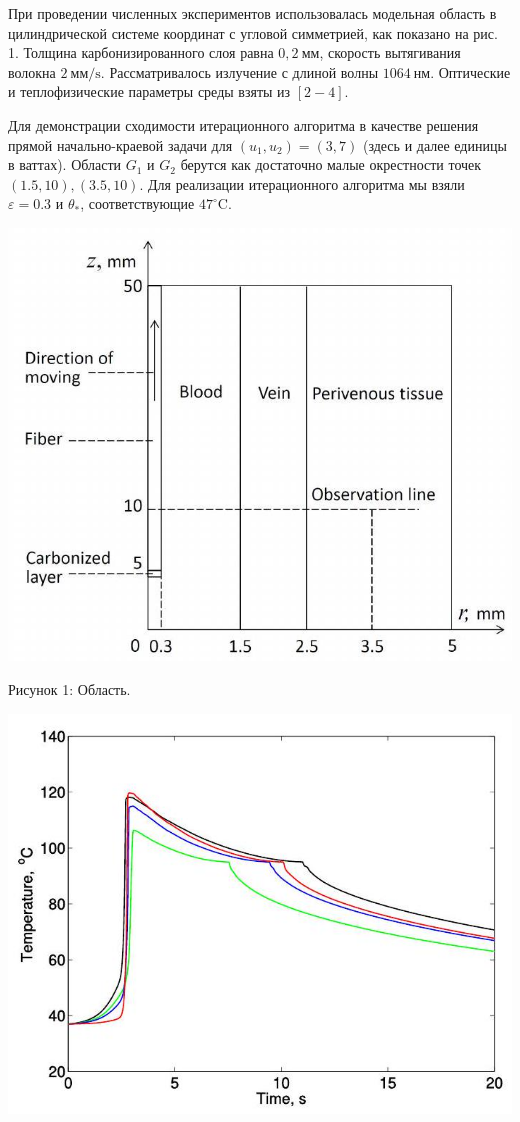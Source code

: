 \documentclass[10pt]{article}
\begin{document}
При проведении численных экспериментов использовалась модельная область в
цилиндрической системе координат с угловой симметрией, как показано на рис. 1.
Толщина карбонизированного слоя равна
$0,2 \mathrm{~мм}$, скорость вытягивания волокна
$2 \mathrm{~мм}/\mathrm{s}$. Рассматривалось излучение с длиной волны
$1064 \mathrm{~нм}$.
Оптические и теплофизические параметры среды взяты из $[2-4]$.


Для демонстрации сходимости итерационного алгоритма в качестве
решения прямой начально-краевой задачи для $\left(u_{1}, u_{2}\right)=( 3,7)$
(здесь и далее единицы в ваттах).
Области $G_{1}$ и $G_{2}$
берутся как достаточно малые окрестности точек $(1.5,10),(3.5,10)$.
Для реализации итерационного алгоритма мы взяли $\varepsilon=0.3$ и $\theta_{*}$,
 соответствующие $47^{\circ} \mathrm{C}$.


\includegraphics[max width=\textwidth]{2022_10_23_0545711a836d5ec06b12g-5}

Рисунок 1: Область.

\includegraphics[max width=\textwidth]{2022_10_23_0545711a836d5ec06b12g-5(1)}
\end{document}

